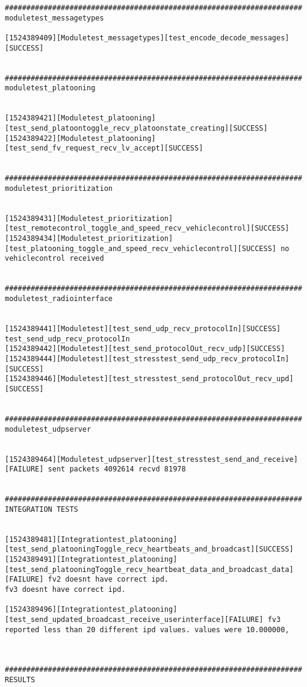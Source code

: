 \documentclass[a4paper, 12pt, titlepage]{scrartcl}
\begin{document}
{\begin{lstlisting}[basicstyle=\tiny]
#####################################################################
moduletest_messagetypes

[1524389409][Moduletest_messagetypes][test_encode_decode_messages][SUCCESS] 


#####################################################################
moduletest_platooning


[1524389421][Moduletest_platooning][test_send_platoontoggle_recv_platoonstate_creating][SUCCESS] 
[1524389422][Moduletest_platooning][test_send_fv_request_recv_lv_accept][SUCCESS] 


#####################################################################
moduletest_prioritization


[1524389431][Moduletest_prioritization][test_remotecontrol_toggle_and_speed_recv_vehiclecontrol][SUCCESS] 
[1524389434][Moduletest_prioritization][test_platooning_toggle_and_speed_recv_vehiclecontrol][SUCCESS] no vehiclecontrol received


#####################################################################
moduletest_radiointerface


[1524389441][Moduletest][test_send_udp_recv_protocolIn][SUCCESS] test_send_udp_recv_protocolIn
[1524389442][Moduletest][test_send_protocolOut_recv_udp][SUCCESS] 
[1524389444][Moduletest][test_stresstest_send_udp_recv_protocolIn][SUCCESS] 
[1524389446][Moduletest][test_stresstest_send_protocolOut_recv_upd][SUCCESS] 


#####################################################################
moduletest_udpserver


[1524389464][Moduletest_udpserver][test_stresstest_send_and_receive][FAILURE] sent packets 4092614 recvd 81978


#####################################################################
INTEGRATION TESTS


[1524389481][Integrationtest_platooning][test_send_platooningToggle_recv_heartbeats_and_broadcast][SUCCESS] 
[1524389491][Integrationtest_platooning][test_send_platooningToggle_recv_heartbeat_data_and_broadcast_data][FAILURE] fv2 doesnt have correct ipd.
fv3 doesnt have correct ipd.

[1524389496][Integrationtest_platooning][test_send_updated_broadcast_receive_userinterface][FAILURE] fv3 reported less than 20 different ipd values. values were 10.000000,



#####################################################################
RESULTS



\end{lstlisting}}
\end{document}
